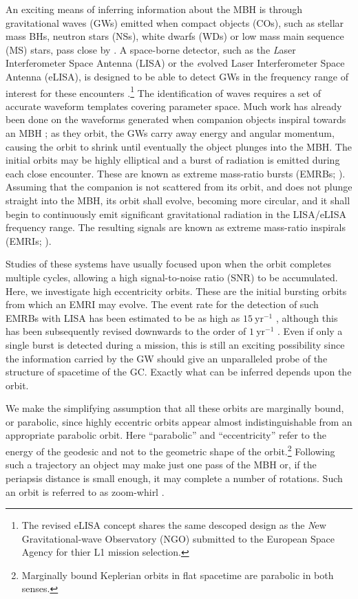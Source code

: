 \documentclass[useAMS,usedcolumn,usegraphicx,usenatbib]{mn2e}
\newcommand{\units}[1]{\ensuremath{~\mathrm{#1}}}
\begin{document}
An exciting means of inferring information about the MBH is through gravitational waves (GWs) emitted when compact objects (COs), such as stellar mass BHs, neutron stars (NSs), white dwarfs (WDs) or low mass main sequence (MS) stars, pass close by \citep{Sathyaprakash2009}. A space-borne detector, such as the {\textit Laser Interferometer Space Antenna} (LISA) or the {\textit evolved Laser Interferometer Space Antenna} (eLISA), is designed to be able to detect GWs in the frequency range of interest for these encounters \citep{Bender1998, Danzmann2003, Jennrich2011, Amaro-Seoane2012a}.\footnote{The revised eLISA concept shares the same descoped design as the {\textit New Gravitational-wave Observatory} (NGO) submitted to the European Space Agency for thier L1 mission selection.} The identification of waves requires a set of accurate waveform templates covering parameter space. Much work has already been done on the waveforms generated when companion objects inspiral towards an MBH \citep{Glampedakis2005}; as they orbit, the GWs carry away energy and angular momentum, causing the orbit to shrink until eventually the object plunges into the MBH. The initial orbits may be highly elliptical and a burst of radiation is emitted during each close encounter. These are known as extreme mass-ratio bursts (EMRBs; \citealt{Rubbo2006}). Assuming that the companion is not scattered from its orbit, and does not plunge straight into the MBH, its orbit shall evolve, becoming more circular, and it shall begin to continuously emit significant gravitational radiation in the LISA/eLISA frequency range. The resulting signals are known as extreme mass-ratio inspirals (EMRIs; \citealt{Amaro-Seoane2007}).

Studies of these systems have usually focused upon when the orbit completes multiple cycles, allowing a high signal-to-noise ratio (SNR) to be accumulated. Here, we investigate high eccentricity orbits. These are the initial bursting orbits from which an EMRI may evolve. The event rate for the detection of such EMRBs with LISA has been estimated to be as high as $15\units{yr^{-1}}$ \citep*{Rubbo2006}, although this has been subsequently revised downwards to the order of $1\units{yr^{-1}}$ \citep*{Hopman2007}. Even if only a single burst is detected during a mission, this is still an exciting possibility since the information carried by the GW should give an unparalleled probe of the structure of spacetime of the GC. Exactly what can be inferred depends upon the orbit. 

We make the simplifying assumption that all these orbits are marginally bound, or parabolic, since highly eccentric orbits appear almost indistinguishable from an appropriate parabolic orbit. Here ``parabolic'' and ``eccentricity'' refer to the energy of the geodesic and not to the geometric shape of the orbit.\footnote{Marginally bound Keplerian orbits in flat spacetime are parabolic in both senses.} Following such a trajectory an object may make just one pass of the MBH or, if the periapsis distance is small enough, it may complete a number of rotations. Such an orbit is referred to as zoom-whirl \citep{Glampedakis2002a}.
\end{document}
